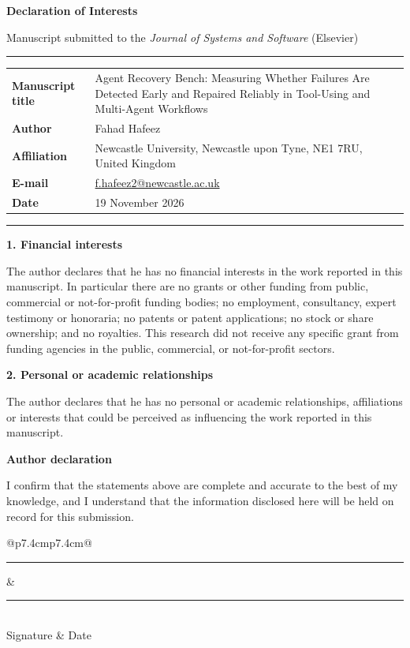 \documentclass[11pt]{article}
\begin{document}
{\Large\bfseries Declaration of Interests}

{\small Manuscript submitted to the \emph{Journal of Systems and Software} (Elsevier)}

\vspace{0.5em}
\hrule
\vspace{0.5em}

\begin{tabular}{@{}p{4.2cm}p{11.4cm}@{}}
\textbf{Manuscript title} & Agent Recovery Bench: Measuring Whether Failures Are
Detected Early and Repaired Reliably in Tool-Using and Multi-Agent Workflows \\
\textbf{Author} & Fahad Hafeez \\
\textbf{Affiliation} & Newcastle University, Newcastle upon Tyne, NE1 7RU,
United Kingdom \\
\textbf{E-mail} & \href{mailto:f.hafeez2@newcastle.ac.uk}{f.hafeez2@newcastle.ac.uk} \\
\textbf{Date} & 19 November 2026 \\
\end{tabular}

\vspace{0.5em}
\hrule

\vspace{1em}
\textbf{1. Financial interests}

The author declares that he has no financial interests in the work reported in this
manuscript. In particular there are no grants or other funding from public, commercial
or not-for-profit funding bodies; no employment, consultancy, expert testimony or
honoraria; no patents or patent applications; no stock or share ownership; and no
royalties. This research did not receive any specific grant from funding agencies in the
public, commercial, or not-for-profit sectors.

\textbf{2. Personal or academic relationships}

The author declares that he has no personal or academic relationships, affiliations or
interests that could be perceived as influencing the work reported in this manuscript.

\vspace{1em}
\textbf{Author declaration}

I confirm that the statements above are complete and accurate to the best of my
knowledge, and I understand that the information disclosed here will be held on record
for this submission.

\vspace{2.5em}
\begin{tabular}{@{}p{7.4cm}p{7.4cm}@{}}
\rule{6.6cm}{0.4pt} & \rule{6.6cm}{0.4pt} \\
Signature & Date \\
 \\
\end{tabular}
\end{document}
